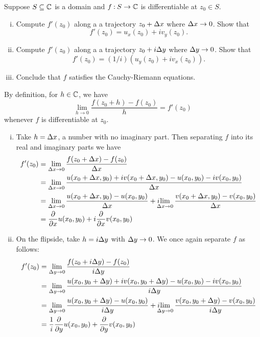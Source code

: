 \documentclass[12pt]{memoir}
\begin{document}
\begin{Ej}
    Suppose $S\subseteq \mathbb{C}$ is a domain and $f\mathbin{:} S\to\mathbb{C}$ is differentiable at $z_0\in S$.
    \begin{enumerate}[i)]
        \itemsep=-0.4em
        \item Compute $f'(z_0)$ along a a trajectory $z_0+\Delta x$ where $\Delta x\to 0$. Show that 
        $$f'(z_0)=u_x(z_0)+iv_y(z_0).$$
        \item Compute $f'(z_0)$ along a a trajectory $z_0+i\Delta y$ where $\Delta y\to 0$. Show that 
        $$f'(z_0)=(1/i)(u_y(z_0)+iv_x(z_0)).$$
        \item Conclude that $f$ satisfies the Cauchy-Riemann equations. 
    \end{enumerate}
\end{Ej}
\begin{ptcbr}
By definition, for $h\in\mathbb{C}$, we have 
$$\lim_{h\to 0}\frac{f(z_0+h)-f(z_0)}{h}=f'(z_0)$$
whenever $f$ is differentiable at $z_0$. 
\begin{enumerate}[i)]
    \itemsep=-0.4em
    \item Take $h=\Delta x$, a number with no imaginary part. Then separating $f$ into its real and imaginary parts we have 
    \begin{align*}
        f'(z_0)&=\lim_{\Dl x\to 0}\frac{f(z_0+\Dl x)-f(z_0)}{\Dl x}\\
        &=\lim_{\Dl x\to 0}\frac{u(x_0+\Dl x,y_0)+iv(x_0+\Dl x,y_0)-u(x_0,y_0)-iv(x_0,y_0)}{\Dl x}\\
        &=\lim_{\Dl x\to 0}\frac{u(x_0+\Dl x,y_0)-u(x_0,y_0)}{\Dl x}+i\hspace{-2mm}\lim_{\Dl x\to 0}\frac{v(x_0+\Dl x,y_0)-v(x_0,y_0)}{\Dl x}\\
        &=\pdv{x}u(x_0,y_0)+i\pdv{x}v(x_0,y_0)
    \end{align*}
    \item On the flipside, take $h=i\Delta y$ with $\Delta y\to 0$. We once again separate $f$ as follows:
    \begin{align*}
        f'(z_0)&=\lim_{\Dl y\to 0}\frac{f(z_0+i\Dl y)-f(z_0)}{i\Dl y}\\
        &=\lim_{\Dl y\to 0}\frac{u(x_0,y_0+\Dl y)+iv(x_0,y_0+\Dl y)-u(x_0,y_0)-iv(x_0,y_0)}{i\Dl y}\\
        &=\lim_{\Dl y\to 0}\frac{u(x_0,y_0+\Dl y)-u(x_0,y_0)}{i\Dl y}+i\hspace{-2mm}\lim_{\Dl y\to 0}\frac{v(x_0,y_0+\Dl y)-v(x_0,y_0)}{i\Dl y}\\
        &=\frac1i\pdv{y}u(x_0,y_0)+\pdv{y}v(x_0,y_0)\\

\end{align*}
\end{enumerate}
\end{ptcbr}
\end{document}
